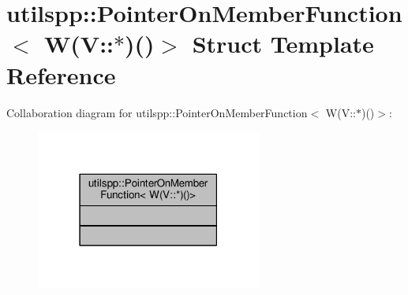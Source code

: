 \hypertarget{structutilspp_1_1PointerOnMemberFunction_3_01W_07V_1_1_5_08_07_08_4}{\section{utilspp\-:\-:Pointer\-On\-Member\-Function$<$ W(V\-:\-:$\ast$)()$>$ Struct Template Reference}
\label{structutilspp_1_1PointerOnMemberFunction_3_01W_07V_1_1_5_08_07_08_4}
}


Collaboration diagram for utilspp\-:\-:Pointer\-On\-Member\-Function$<$ W(V\-:\-:$\ast$)()$>$\-:\nopagebreak
\begin{figure}[H]
\begin{center}
\leavevmode
\includegraphics[width=210pt]{structutilspp_1_1PointerOnMemberFunction_3_01W_07V_1_1_5_08_07_08_4__coll__graph}
\end{center}
\end{figure}
